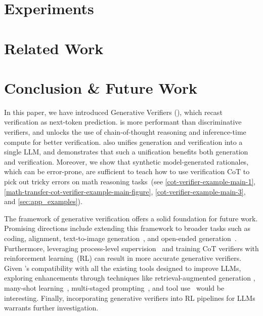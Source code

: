 \documentclass[11pt, letterpaper, logo, copyright]{googledeepmind}
\begin{document}
\vspace{-0.4cm}

\section{Experiments}
\label{sec:experiments}


\section{Related Work}



\section{Conclusion \& Future Work}

In this paper, we have introduced Generative Verifiers ({\genV}), which recast verification as next-token prediction. {\genV} is more performant than discriminative verifiers, and unlocks the use of chain-of-thought reasoning and inference-time compute for better verification. {\genV} also unifies generation and verification into a single LLM, and demonstrates that such a unification benefits both generation and verification. Moreover, we show that synthetic model-generated rationales, which can be error-prone, are sufficient to teach {\genV} how to use verification CoT to pick out tricky errors on math reasoning tasks~(see \autoref{cot-verifier-example-main-1}, \ref{math-transfer-cot-verifier-example-main-figure}, \ref{cot-verifier-example-main-3}, and \autoref{sec:app_examples}).

The framework of generative verification offers a solid foundation for future work. Promising directions include extending this framework to broader tasks such as coding, alignment, text-to-image generation~\citep{lin2024evaluating}, and open-ended generation~\citep{besta2024checkembed}. Furthermore, leveraging process-level supervision~\citep{lightman2023let} and training CoT verifiers with reinforcement learning~(RL) can result in more accurate generative verifiers. Given \genV's compatibility with all the existing tools designed to improve LLMs, exploring enhancements through techniques like retrieval-augmented generation \citep{improve-lm-with-rag}, 
many-shot learning~\citep{agarwal2024many}, multi-staged prompting~\citep{tree-of-thoughts}, and tool use~\citep{toolformer} would be interesting. Finally, incorporating generative verifiers into RL pipelines for LLMs warrants further investigation.
\end{document}
